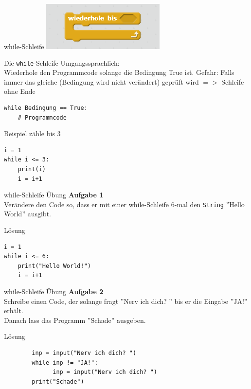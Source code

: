 \begin{frame}{while-Schleife}
\centering\includegraphics[scale=1.0]{images/while}
\end{frame}

\begin{frame}[fragile]{Die \texttt{while}-Schleife}
	Umgangssprachlich:\\
	Wiederhole den Programmcode solange die Bedingung True ist.
	Gefahr: Falls immer das gleiche (Bedingung wird nicht verändert) geprüft wird $=>$ Schleife ohne Ende

    \begin{lstlisting}
while Bedingung == True:
    # Programmcode

    \end{lstlisting}
    
    Beispiel zähle bis 3
    \begin{lstlisting}
i = 1
while i <= 3:
    print(i)
    i = i+1   
    \end{lstlisting}
   
\end{frame}

\begin{frame}[fragile]{while-Schleife Übung}
\textbf{Aufgabe 1}\\
	Verändere den Code so, dass er mit einer while-Schleife 6-mal den \texttt{String} ''Hello World'' ausgibt.

\pause{}
\begin{exampleblock}{Lösung}
	\begin{lstlisting}		 
i = 1
while i <= 6:
	print("Hello World!")
	i = i+1   		
	\end{lstlisting}
\end{exampleblock}
\end{frame}

\begin{frame}[fragile]{while-Schleife Übung}
\textbf{Aufgabe 2}\\
	Schreibe einen Code, der solange fragt ''Nerv ich dich? '' bis er die Eingabe ''JA!'' erhält.\\
	Danach lass das Programm ''Schade'' ausgeben.
	

\pause{}
\begin{exampleblock}{Lösung}
	\begin{lstlisting}		 
		inp = input("Nerv ich dich? ")
		while inp != "JA!":
			  inp = input("Nerv ich dich? ")
		print("Schade")	
	\end{lstlisting}
\end{exampleblock}
\end{frame}



